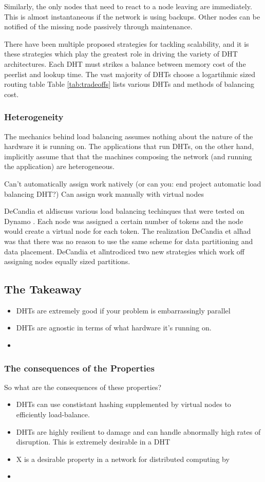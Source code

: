 \documentclass[10pt,letterpaper]{report}
\begin{document}
Similarly, the only nodes that need to react to a node leaving are immediately.
This is almost instantaneous if the network is using backups.
Other nodes can be notified of the missing node passively through maintenance.

There have been multiple proposed strategies for tackling scalability, and it is these strategies which play the greatest role in driving the variety of DHT architectures. 
Each DHT must strikes a balance between memory cost of the peerlist and lookup time. 
The vast majority of DHTs choose a logartihmic sized routing table
Table \ref{tab:tradeoffs} lists various DHTs and methods of balancing cost.

\subsubsection{Heterogeneity}
The mechanics behind load balancing assumes nothing about the nature of the hardware it is running on.
The applications that run DHTs, on the other hand, implicitly assume that that the machines composing the network (and running the application) are heterogeneous.


Can't automatically assign work natively (or can you: end project automatic load balancing DHT?)
Can assign work manually with virtual nodes 


DeCandia et al\. discuss various load balancing techinques that were tested on Dynamo \cite{dynamo}.  
Each node was assigned a certain number of tokens and the node would create a virtual node for each token.
The realization DeCandia et al\. had was that there was no reason to use the same scheme for data partitioning and data placement.
DeCandia et al\. introdiced two new strategies which work off assigning nodes equally sized partitions.


\subsection{The Takeaway}


\begin{itemize}
	\item DHTs are extremely good if your problem is embarrassingly parallel
	\item DHTs are agnostic in terms of what hardware it's running on.
	\item
\end{itemize}
\subsubsection{The consequences of the Properties}
So what are the consequences of these properties?
\begin{itemize}
    \item DHTs can use constistant hashing supplemented by virtual nodes to efficiently load-balance.
	\item DHTs are highly resilient to damage and can handle abnormally high rates of disruption.  This is extremely desirable in a DHT
	\item X is a desirable property in a network for distributed computing by
	\item 
\end{itemize}
\end{document}
